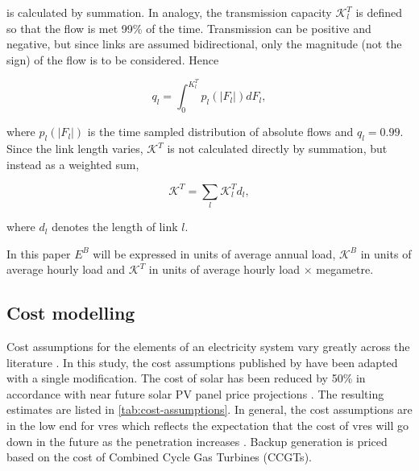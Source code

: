 \documentclass[a4paper, 5p, sort&compress]{elsarticle}%
\begin{document}
is calculated by summation. In analogy, the transmission capacity $\mathcal{K}^{T}_{l}$ is defined
so that the flow is met 99\% of the time. Transmission can be
positive and negative, but since links are assumed bidirectional, only
the magnitude (not the sign) of the flow is to be considered. Hence

\begin{equation}
  \label{eq:link-cap}
  q_{l} = \int _{0} ^{K_{l}^{T}} p_{l}(|F_{l}|)dF_{l},
\end{equation}

where $p_{l}(|F_{l}|)$ is the time sampled distribution of absolute
flows and $q_{l} = 0.99$. Since the link length varies,
$\mathcal{K}^{T}$ is not calculated directly by summation, but instead
as a weighted sum,

\begin{equation}
  \label{eq:4}
  \mathcal{K}^{T} = \sum_{l} \mathcal{K}^{T}_{l} d_{l},
\end{equation}

where $d_{l}$ denotes the length of link $l$. 

In this paper $E^{B}$ will be expressed in units of average annual
load, $\mathcal{K}^{B}$ in units of average hourly load and
$\mathcal{K}^{T}$ in units of average hourly load $\times$ megametre.

\subsection{Cost modelling}
\label{sec:cost-modelling}

Cost assumptions for the elements of an electricity system vary
greatly across the literature \cite{Sensitivity}. In this study, the
cost assumptions published by \cite{Rolando} have been adapted with a
single modification. The cost of solar has been reduced by 50\% in
accordance with near future solar PV panel price projections
\cite{irena}. The resulting estimates are listed in
\cref{tab:cost-assumptions}. In general, the cost assumptions are in
the low end for \gls{vres} which reflects the expectation that the cost of
\gls{vres} will go down in the future as the penetration increases
\cite{Fraunhofer}.  Backup generation is priced based on the cost of Combined Cycle Gas Turbines (CCGTs).
\end{document}
